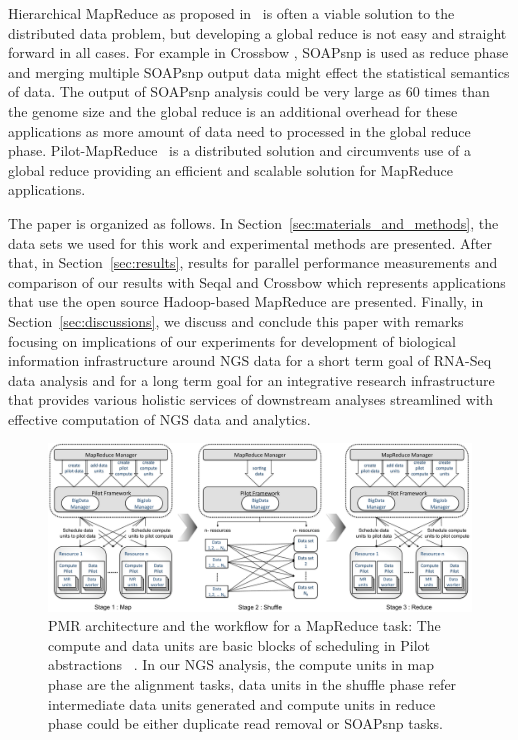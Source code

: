 \documentclass{acm_proc_article-sp}
\begin{document}
Hierarchical MapReduce as proposed in~\cite{ecmls11-mr-autodock} is
often a viable solution to the distributed data problem, but
developing a global reduce is not easy and straight forward in all
cases. For example in Crossbow \cite{langmead2010}, SOAPsnp is used as
reduce phase and merging multiple SOAPsnp output data might effect the
statistical semantics of data. The output of SOAPsnp analysis could be
very large as 60 times than the genome size\cite{soap_snp} and the
global reduce is an additional overhead for these applications as more
amount of data need to processed in the global reduce
phase. Pilot-MapReduce~\cite{pmr2012} is a distributed solution and
circumvents use of a global reduce providing an efficient and scalable
solution for MapReduce applications.

The paper is organized as follows. In
Section~\ref{sec:materials_and_methods}, the data sets we used for
this work and experimental methods are presented.
After that, in Section~\ref{sec:results}, results for parallel performance
measurements and comparison of our results with Seqal and Crossbow
which represents applications that use the open source Hadoop-based
MapReduce\cite{hadoop-url, taylor2010,seal_2011_mapred,seal2011} are
presented.  Finally, in Section~\ref{sec:discussions}, we 
discuss and conclude this paper with remarks focusing on
implications of our experiments for development of biological
information infrastructure around NGS data for a short term goal of
RNA-Seq data analysis and for a long term goal for an integrative
research infrastructure that provides various holistic services of
downstream analyses streamlined with effective computation of NGS data
and analytics.

\begin{center}
\hfill{}
\begin{figure}
 \centering
\includegraphics[scale=0.35]{figures/F1_1.pdf} 
\hfill{}
\caption{\small PMR architecture and the workflow for a MapReduce task: The compute and data units are basic blocks of scheduling in Pilot abstractions ~\cite{pstar11}. In our NGS analysis, the compute units in map phase are the alignment tasks, data units in the shuffle phase refer intermediate data units generated and compute units in reduce phase could be either duplicate read removal or SOAPsnp tasks.}
  \label{fig:arch-pj-saga-mr} 
\end{figure}
\end{center}
\end{document}
